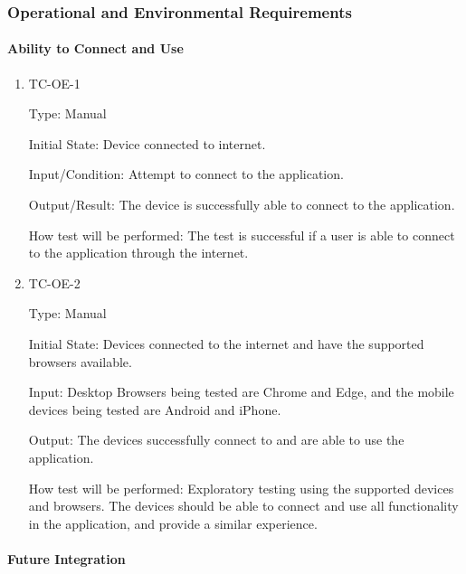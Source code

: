\documentclass[12pt, titlepage]{article}
\begin{document}
\subsubsection{Operational and Environmental Requirements}

\paragraph{Ability to Connect and Use}

\begin{enumerate}

  \item{TC-OE-1\\}

    Type: Manual

    Initial State: Device connected to internet.

    Input/Condition: Attempt to connect to the application.

    Output/Result: The device is successfully able to connect to the
    application.

    How test will be performed: The test is successful if a user is
    able to connect to the application through the internet.

  \item{TC-OE-2\\}

    Type: Manual

    Initial State: Devices connected to the internet and have the
    supported browsers available.

    Input: Desktop Browsers being tested are Chrome and Edge, and the
    mobile devices being tested are Android and iPhone.

    Output: The devices successfully connect to and are able to use
    the application.

    How test will be performed: Exploratory testing using the
    supported devices and browsers. The devices should be able to
    connect and use all functionality in the application, and provide
    a similar experience.

\end{enumerate}

\paragraph{Future Integration}
\end{document}

